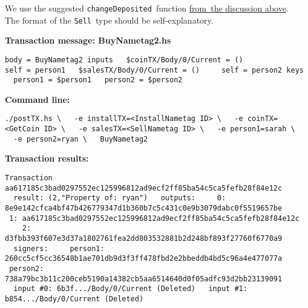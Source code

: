\documentclass[11pt]{article}
\newcommand{\codeblock}[1]{\begin{mdframed}[
    backgroundcolor=header-color,
    linecolor=header-color,
    innertopmargin=10pt,
    ]{\texttt{#1}}\end{mdframed}}
\DeclareRobustCommand{\fuline}[1]{\texorpdfstring{\uline{#1}}{#1}}
\begin{document}
We use the suggested \texttt{changeDeposited} function \href{https://consensys.quip.com/9kkhA5IlabyD/Tutorial-3-Selling-buying-and-trading\%23CWNACA7tuft}{\fuline{from the discussion above}}.  The format of the \texttt{Sell} type should be self-explanatory.


\vspace{11pt}

\textbf{Transaction message: BuyNametag2.hs}

\codeblock{body = BuyNametag2\newline
inputs\newline
  \$coinTX\slash{}Body\slash{}0\slash{}Current = ()\newline
    self = person1\newline
  \$salesTX\slash{}Body\slash{}0\slash{}Current = ()\newline
    self = person2\newline
keys\newline
  person1 = \$person1\newline
  person2 = \$person2}

\textbf{Command line:}

\codeblock{.\slash{}postTX.hs \textbackslash{}\newline
  -e installTX=\textless{}InstallNametag ID\textgreater{} \textbackslash{}\newline
  -e coinTX=\textless{}GetCoin ID\textgreater{} \textbackslash{}\newline
  -e salesTX=\textless{}SellNametag ID\textgreater{} \textbackslash{}\newline
  -e person1=sarah \textbackslash{}\newline
  -e person2=ryan \textbackslash{}\newline
  BuyNametag2}

\textbf{Transaction results:}

\codeblock{Transaction aa617185c3bad0297552ec125996812ad9ecf2ff85ba54c5ca5fefb28f84e12c\newline
  result: (2,"Property of: ryan")\newline
  outputs:\newline
    0: 8e9e142cfca4bf47b426779347d1b360b7c5c431c0e9b3079dabc0f5519657be\newline
    1: aa617185c3bad0297552ec125996812ad9ecf2ff85ba54c5ca5fefb28f84e12c\newline
    2: d3fbb393f607e3d37a1802761fea2dd803532881b2d248bf893f27760f6770a9\newline
  signers:\newline
    person1: 260cc5cf5cc36548b1ae701db9d3f3ff478fbd2e2bbeddb4bd5c96a4e477077a\newline
    person2: 738a79bc3b11c200ceb5190a14382cb5aa6514640d0f05adfc93d2bb23139091\newline
  input \#0: 6b3f...\slash{}Body\slash{}0\slash{}Current (Deleted)\newline
  input \#1: b854...\slash{}Body\slash{}0\slash{}Current (Deleted)}
\end{document}
